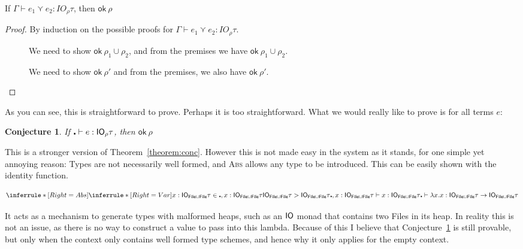 \begin{theorem}\label{theorem:conc}
  If $\Gamma \vdash e_1 \curlyvee e_2 : IO_\rho \tau$, then $\textsf{ok} \ \rho$
\end{theorem}
\begin{proof}
  By induction on the possible proofs for $\Gamma \vdash e_1 \curlyvee e_2 : IO_\rho \tau$.
  \begin{description}
  \item[\textmd{}]
    We need to show $\textsf{ok} \ \rho_1 \cup \rho_2$, and from the premises we have $\textsf{ok} \ \rho_1 \cup \rho_2$.
  \item[\textmd{}]
    We need to show $\textsf{ok} \ \rho'$ and from the premises, we also have $\textsf{ok} \ \rho'$. 
  \end{description}
\end{proof}
As you can see, this is straightforward to prove. Perhaps it is too
straightforward. What we would really like to prove is for all terms
$e$:
\newtheorem{conjecture}{Conjecture}
\begin{conjecture}\label{conjecture:strongconc}
  If $\centerdot \vdash e : \mathsf{IO}_\rho \tau$, then $\textsf{ok} \ \rho$
\end{conjecture}
This is a stronger version of Theorem~\ref{theorem:conc}. However this
is not made easy in the system as it stands, for one simple yet
annoying reason: Types are not necessarily well formed, and
\textsc{Abs} allows any type to be introduced. This can be easily
shown with the identity function.

\[
  \inferrule*[Right=Abs]{
  \inferrule*[Right=Var]{x : \IO_{\textsf{File} \cup \textsf{File}} \tau  \in
    \centerdot , x : \IO_{\textsf{File} \cup \textsf{File}} \tau \\  \IO_{\textsf{File} \cup \textsf{File}} \tau >
    \IO_{\textsf{File} \cup \textsf{File}} \tau }{\centerdot , x : \IO_{\textsf{File} \cup
      \textsf{File}} \tau \vdash x : \IO_{\textsf{File} \cup \textsf{File}} \tau}
}
{\centerdot \vdash \lambda x . x : \IO_{\textsf{File} \cup \textsf{File}} \tau \rightarrow \IO_{\textsf{File} \cup \textsf{File}} \tau}
\]

It acts as a mechanism to generate types with malformed heaps, such as
an $\mathsf{IO}$ monad that contains two \textsf{File}s in its heap.  In
reality this is not an issue, as there is no way to construct a value
to pass into this lambda. Because of this I believe that Conjecture~\ref{conjecture:strongconc} is still
provable, but only when the context only contains well formed type
schemes, and hence why it only applies for the empty context.

